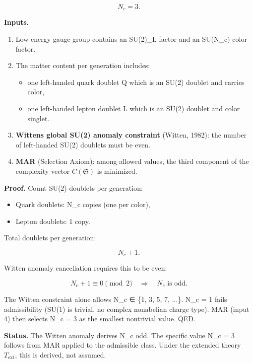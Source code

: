 \[
N_c = 3.
\]

\textbf{Inputs.}

\begin{enumerate}
\def\labelenumi{\arabic{enumi}.}
\tightlist
\item
  Low-energy gauge group contains an SU(2)\_L factor and an SU(N\_c) color factor.
\item
  The matter content per generation includes:

  \begin{itemize}
  \tightlist
  \item
    one left-handed quark doublet Q which is an SU(2) doublet and carries color,
  \item
    one left-handed lepton doublet L which is an SU(2) doublet and color singlet.
  \end{itemize}
\item
  \textbf{Witten\textquotesingle s global SU(2) anomaly constraint} (Witten, 1982): the number of left-handed SU(2) doublets must be even.
\item
  \textbf{MAR} (Selection Axiom): among allowed values, the third component of the complexity vector \(C(\mathfrak S)\) is minimized.
\end{enumerate}

\textbf{Proof.} Count SU(2) doublets per generation:

\begin{itemize}
\tightlist
\item
  Quark doublets: N\_c copies (one per color),
\item
  Lepton doublets: 1 copy.
\end{itemize}

Total doublets per generation:

\[
N_c + 1.
\]

Witten anomaly cancellation requires this to be even:

\[
N_c + 1 \equiv 0 \pmod{2} \quad \Rightarrow \quad N_c \text{ is odd}.
\]

The Witten constraint alone allows N\_c ∈ \{1, 3, 5, 7, ...\}. N\_c = 1 fails admissibility (SU(1) is trivial, no complex nonabelian charge type). MAR (input 4) then selects N\_c = 3 as the smallest nontrivial value. QED.

\textbf{Status.} The Witten anomaly derives N\_c odd. The specific value N\_c = 3 follows from MAR applied to the admissible class. Under the extended theory \(T_{\mathrm{ext}}\), this is derived, not assumed.

